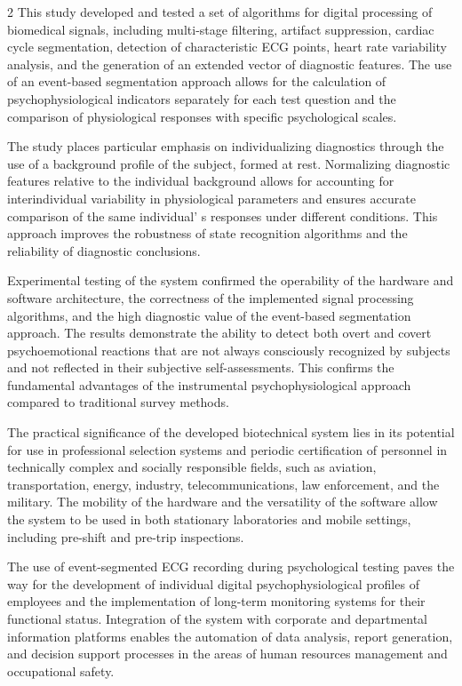 \begin{multicols}{2}
This study developed and tested a set of algorithms for digital
processing of biomedical signals, including multi-stage filtering,
artifact suppression, cardiac cycle segmentation, detection of
characteristic ECG points, heart rate variability analysis, and the
generation of an extended vector of diagnostic features. The use of an
event-based segmentation approach allows for the calculation of
psychophysiological indicators separately for each test question and the
comparison of physiological responses with specific psychological
scales.

The study places particular emphasis on individualizing diagnostics
through the use of a background profile of the subject, formed at rest.
Normalizing diagnostic features relative to the individual background
allows for accounting for interindividual variability in physiological
parameters and ensures accurate comparison of the same
individual' s responses under different conditions. This
approach improves the robustness of state recognition algorithms and the
reliability of diagnostic conclusions.

Experimental testing of the system confirmed the operability of the
hardware and software architecture, the correctness of the implemented
signal processing algorithms, and the high diagnostic value of the
event-based segmentation approach. The results demonstrate the ability
to detect both overt and covert psychoemotional reactions that are not
always consciously recognized by subjects and not reflected in their
subjective self-assessments. This confirms the fundamental advantages of
the instrumental psychophysiological approach compared to traditional
survey methods.

The practical significance of the developed biotechnical system lies in
its potential for use in professional selection systems and periodic
certification of personnel in technically complex and socially
responsible fields, such as aviation, transportation, energy, industry,
telecommunications, law enforcement, and the military. The mobility of
the hardware and the versatility of the software allow the system to be
used in both stationary laboratories and mobile settings, including
pre-shift and pre-trip inspections.

The use of event-segmented ECG recording during psychological testing
paves the way for the development of individual digital
psychophysiological profiles of employees and the implementation of
long-term monitoring systems for their functional status. Integration of
the system with corporate and departmental information platforms enables
the automation of data analysis, report generation, and decision support
processes in the areas of human resources management and occupational
safety.


\end{multicols}

